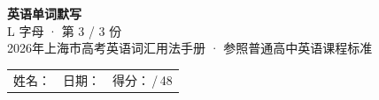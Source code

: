 \documentclass[10pt,a4paper]{article}
\begin{document}
\pagestyle{plain}

\begin{center}
{\LARGE\bfseries 英语单词默写}\\[0.22em]
{\large L 字母 · 第 3 / 3 份}\\[0.18em]
{\small 2026年上海市高考英语词汇用法手册 · 参照普通高中英语课程标准}
\end{center}

\vspace{0.25em}
\noindent\begin{tabular}{@{}p{}@{}p{}@{}p{}@{}}
姓名：\underline{\hspace{2.0cm}} & 日期：\underline{\hspace{2.0cm}} & 得分：\underline{\hspace{1.3cm}}\,/\,48 \\
\end{tabular}

\vspace{0.3em}

\vspace{0.08em}
\end{document}
